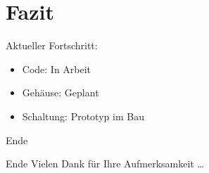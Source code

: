 \documentclass[mathserif,9pt]{beamer}
\begin{document}
    \section{Fazit}
    \begin{frame}
        \begin{block}{Aktueller Fortschritt:}
            \begin{itemize}{}
                \item Code: In Arbeit
                \item Gehäuse: Geplant
                \item Schaltung: Prototyp im Bau
            \end{itemize}
        \end{block}
    \end{frame}

    
    \begin{frame}{Ende}
        \begin{block}{Ende}
            Vielen Dank für Ihre Aufmerksamkeit \ldots
        \end{block}
    \end{frame}

\end{document}
